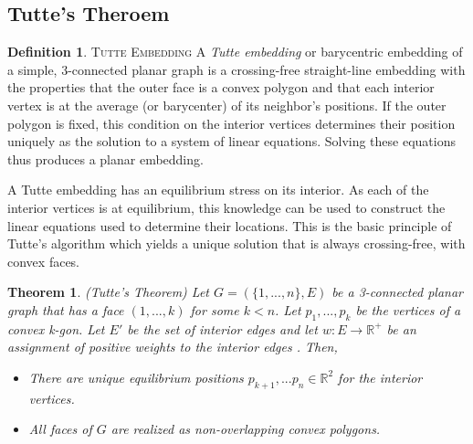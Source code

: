 \documentclass[11pt]{article}
\newcommand{\R}{\mathbb{R}}
\newtheorem{theorem}{Theorem}[section]
\theoremstyle{definition}
\newtheorem{definition}{Definition}[section]
\begin{document}
\subsection{Tutte's Theroem}
	\theoremstyle{definition}
	\begin{definition}{\textsc{Tutte Embedding}}
		A \emph{Tutte embedding} or barycentric embedding of a simple, 3-connected planar graph is a crossing-free straight-line embedding with the properties that the outer face is a convex polygon and that each interior vertex is at the average (or barycenter) of its neighbor's positions. 
		If the outer polygon is fixed, this condition on the interior vertices determines their position uniquely as the solution to a system of linear equations. 
		Solving these equations thus produces a planar embedding. 
  	\end{definition}
	
	A Tutte embedding has an equilibrium stress on its interior. As each of the interior vertices is at equilibrium, this knowledge can be used to construct the linear equations used to determine their locations.
	This is the basic principle of Tutte's algorithm which yields a unique solution that is always crossing-free, with convex faces.
 	
 	\begin{theorem}{(Tutte's Theorem)}
 		Let $G = (\{1,...,n\},E)$ be a 3-connected planar graph that has a face $(1,...,k)$ for some $k<n$. Let $p_1,...,p_k$ be the vertices of a convex k-gon. 
		Let $E'$ be the set of interior edges and let $w : E \rightarrow \R^+$ be an assignment of positive weights to the interior edges \cite{realizationSpaces}. Then,
 		\begin{itemize}
			\item There are unique equilibrium positions $p_{k+1}, ...p_n \in \R^2$ for the interior vertices. 
			\item All faces of $G$ are realized as non-overlapping convex polygons.
		\end{itemize}
	\end{theorem}
\end{document}
